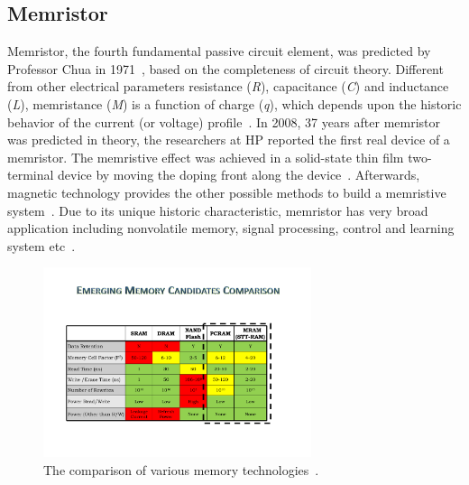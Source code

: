 \subsection{Memristor}
Memristor, the fourth fundamental passive circuit element, was predicted by Professor Chua in 1971~\cite{Chua71}, based on the completeness of circuit theory. Different from other electrical parameters resistance (\textit{R}), capacitance (\textit{C}) and inductance (\textit{L}), memristance (\textit{M}) is a function of charge (\textit{q}),  which depends upon the historic behavior of the current (or voltage) profile~\cite{Chua76}. In 2008, 37 years after memristor was predicted in theory, the researchers at HP reported the first real device of a memristor. The memristive effect was achieved in a solid-state thin film two-terminal device by moving the doping front along the device~\cite{Tour08}. Afterwards, magnetic technology provides the other possible methods to build a memristive system~\cite{Pershin08,Wang09}. Due to its unique historic characteristic, memristor has very broad application including nonvolatile memory, signal processing, control and learning system etc~\cite{Chen09}.


\begin{figure}
\centering
\vspace{-10pt} \includegraphics[width=0.7\textwidth]{./figure/table.pdf} \vspace{-10pt}
\caption{The comparison of various memory
technologies~\cite{ITRS07}.}\label{table} \vspace{-10pt}
\end{figure}

